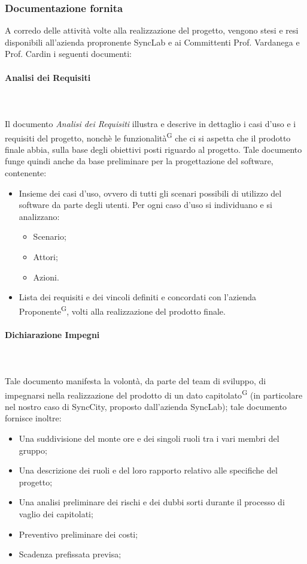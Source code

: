 \documentclass[8pt]{article}
\newcommand{\glossterm}[1]{#1\textsuperscript{G}} %
\newcommand{\subsubsubsection}[1]{\paragraph{#1}\mbox{}\\}
\begin{document}
\subsubsection{Documentazione fornita}
A corredo delle attività volte alla realizzazione del progetto, vengono stesi e resi disponibili
all'azienda propronente SyncLab e ai Committenti Prof. Vardanega e Prof. Cardin i seguenti documenti:
\subsubsubsection{Analisi dei Requisiti} \label{sec:ar1}\\
Il documento \textit{Analisi dei Requisiti }illustra e descrive in dettaglio i casi d'uso e i requisiti del progetto, nonchè le \glossterm{funzionalità} che ci si aspetta che il prodotto finale abbia, sulla base degli obiettivi posti riguardo al progetto. Tale documento funge quindi anche da base preliminare per la progettazione del software, contenente:
\begin{itemize}
    \item Insieme dei casi d'uso, ovvero di tutti gli scenari possibili di utilizzo del software da
        parte degli utenti. Per ogni caso d'uso si individuano e si analizzano: 
    \begin{itemize}
        \item Scenario;
        \item Attori;
        \item Azioni.
    \end{itemize} 
    \item Lista dei requisiti e dei vincoli definiti e concordati con l'azienda \glossterm{Proponente}, volti alla realizzazione del prodotto finale.
\end{itemize}

\subsubsubsection{Dichiarazione Impegni}\\
Tale documento manifesta la volontà, da parte del team di sviluppo, di impegnarsi nella realizzazione del prodotto di un dato \glossterm{capitolato} (in particolare nel nostro caso di SyncCity, proposto dall'azienda SyncLab); tale documento fornisce inoltre:
\begin{itemize}
    \item Una suddivisione del monte ore e dei singoli ruoli tra i vari membri del gruppo;
    \item Una descrizione dei ruoli e del loro rapporto relativo alle specifiche del progetto;
    \item Una analisi preliminare dei rischi e dei dubbi sorti durante il processo di vaglio dei capitolati;
    \item Preventivo preliminare dei costi;
    \item Scadenza prefissata previsa;
\end{itemize}
\end{document}
